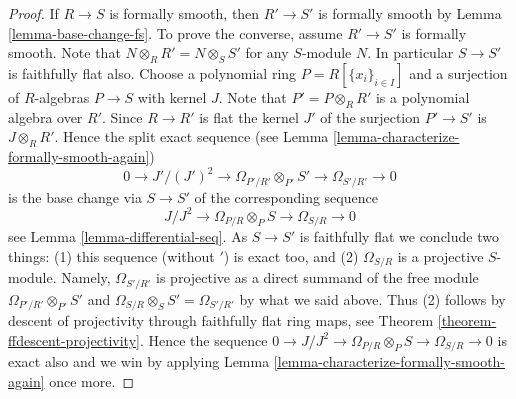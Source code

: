 \documentclass[10pt,a4paper]{amsart}
\theoremstyle{plain}
\theoremstyle{definition}
\theoremstyle{remark}
\numberwithin{equation}{subsection}
\begin{document}
\begin{proof}
If $R \to S$ is formally smooth, then $R' \to S'$ is formally smooth by
Lemma \ref{lemma-base-change-fs}.
To prove the converse, assume $R' \to S'$ is formally smooth.
Note that $N \otimes_R R' = N \otimes_S S'$ for any $S$-module $N$. In
particular $S \to S'$ is faithfully flat also.
Choose a polynomial ring $P = R[\{x_i\}_{i \in I}]$ and a surjection
of $R$-algebras $P \to S$ with kernel $J$. Note that $P' = P \otimes_R R'$
is a polynomial algebra over $R'$. Since $R \to R'$ is flat the kernel
$J'$ of the surjection $P' \to S'$ is $J \otimes_R R'$. Hence the
split exact sequence (see
Lemma \ref{lemma-characterize-formally-smooth-again})
$$
0 \to J'/(J')^2 \to \Omega_{P'/R'} \otimes_{P'} S' \to \Omega_{S'/R'} \to 0
$$
is the base change via $S \to S'$ of the corresponding sequence
$$
J/J^2 \to \Omega_{P/R} \otimes_P S \to \Omega_{S/R} \to 0
$$
see
Lemma \ref{lemma-differential-seq}.
As $S \to S'$ is faithfully flat we conclude two things:
(1) this sequence (without ${}'$) is exact too, and (2)
$\Omega_{S/R}$ is a projective $S$-module. Namely, $\Omega_{S'/R'}$
is projective as a direct summand of the free module
$\Omega_{P'/R'} \otimes_{P'} S'$ and
$\Omega_{S/R} \otimes_S {S'} = \Omega_{S'/R'}$ by what we said above.
Thus (2) follows by descent of projectivity
through faithfully flat ring maps, see
Theorem \ref{theorem-ffdescent-projectivity}.
Hence the sequence
$0 \to J/J^2 \to \Omega_{P/R} \otimes_P S \to \Omega_{S/R} \to 0$
is exact also and we win by applying
Lemma \ref{lemma-characterize-formally-smooth-again}
once more.
\end{proof}
\end{document}
